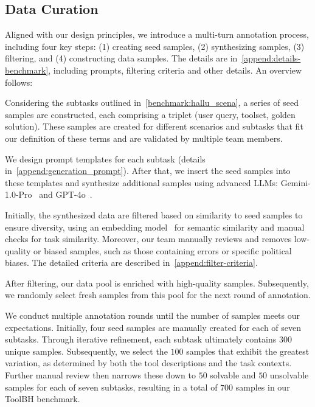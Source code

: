 \documentclass[11pt]{article}
\newcommand{\benchname}{ToolBH\xspace}
\begin{document}
\subsection{Data Curation}
\label{ss:data-curation}

Aligned with our design principles, we introduce a multi-turn annotation process, including four key steps: (1) creating seed samples, (2) synthesizing samples, (3) filtering, and (4) constructing data samples.
The details are in~\cref{append:details-benchmark}, including prompts, filtering criteria and other details.
An overview follows:

 Considering the subtasks outlined in~\cref{benchmark:hallu_scena}, a series of seed samples are constructed, each comprising a triplet (user query, toolset, golden solution). These samples are created for different scenarios and subtasks that fit our definition of these terms and are validated by multiple team members.

We design prompt templates for each subtask (details in~\cref{append:generation_prompt}).
After that, we insert the seed samples into these templates and synthesize additional samples using advanced LLMs: Gemini-1.0-Pro~\cite{DBLP:journals/corr/abs-2312-11805@gemini-1.0} and GPT-4o~\cite{openai@gpt4o}. 

Initially, the synthesized data are filtered based on similarity to seed samples to ensure diversity, using an embedding model~\cite{DBLP:conf/acl/WangBHDW21@minilmv2} for semantic similarity and manual checks for task similarity.
Moreover, our team manually reviews and removes low-quality or biased samples, such as those containing errors or specific political biases. 
The detailed criteria are described in~\cref{append:filter-criteria}.



After filtering, our data pool is enriched with high-quality samples.
Subsequently, we randomly select fresh samples from this pool for the next round of annotation.

We conduct multiple annotation rounds until the number of samples meets our expectations.
Initially, four seed samples are manually created for each of seven subtasks. 
Through iterative refinement, each subtask ultimately contains $300$ unique samples.
Subsequently, we select the $100$ samples that exhibit the greatest variation, as determined by both the tool descriptions and the task contexts.
Further manual review then narrows these down to $50$ solvable and $50$ unsolvable samples for each of seven subtasks, resulting in a total of $700$ samples in our \benchname benchmark.
\end{document}
